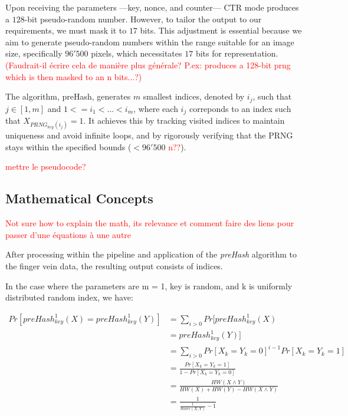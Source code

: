 Upon receiving the parameters —key, nonce, and counter— CTR mode produces a \(128\)-bit pseudo-random number. However, to tailor the output to our requirements, we must mask it to \(17\) bits. This adjustment is essential because we aim to generate pseudo-random numbers within the range suitable for an image size, specifically \(96'500\) pixels, which necessitates \(17\) bits for representation. \textcolor{red}{(Faudrait-il écrire cela de manière plus générale? P.ex: produces a 128-bit prng which is then masked to an n bits...?)}

The algorithm, preHash, generates \(m\) smallest indices, denoted by \(i_j\), such that \(j\in{[1, m]} \) and \(1 <= i_1 < ... < i_m\), where each \(i_j\) correponds to an index such that \(X_{PRNG_{key}(i_j)} = 1\). It achieves this by tracking visited indices to maintain uniqueness and avoid infinite loops, and by rigorously verifying that the PRNG stays within the specified bounds (\(< 96'500\) \textcolor{red}{n??}).   

\textcolor{red}{mettre le pseudocode?}

\subsection{Mathematical Concepts}
\textcolor{red}{Not sure how to explain the math, its relevance et comment faire des liens pour passer d'une équations à une autre}

After processing within the pipeline and application of the \textit{preHash} algorithm to the finger vein data, the resulting output consists of indices. 

In the case where the parameters are m = 1, key is random, and k is uniformly distributed random index, we have: 

\begin{equation} \label{eq:preHash1}
    \begin{aligned}
        Pr[preHash_{key}^1(X) = preHash_{key}^1(Y)] &= \sum_{i > 0} Pr[preHash_{key}^1(X)\\
        &= preHash_{key}^1(Y)]\\
        &= \sum_{i > 0} Pr[X_k = Y_k = 0]^{i - 1} Pr[X_k = Y_k = 1]\\
        &= \frac{Pr[X_k = Y_k = 1]}{1 - Pr[X_k = Y_k = 0]}\\
        &= \frac{HW(X \land Y)}{HW(X) + HW(Y) - HW(X \land Y)}\\
        &= \frac{1}{\frac{1}{Score(X, Y)} - 1}
    \end{aligned}
\end{equation}

